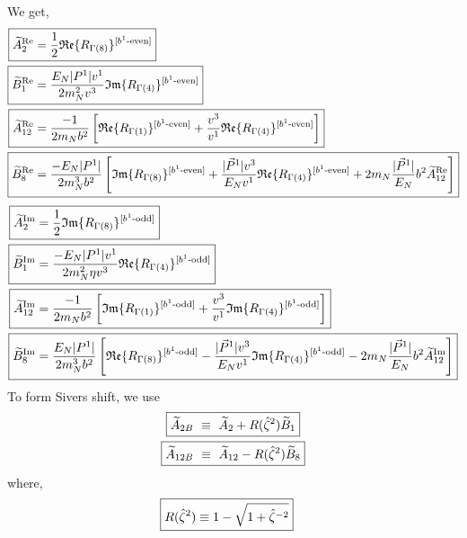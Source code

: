\documentclass[]{article}
\numberwithin{equation}{section}
\newcommand{\tAmp}{\widetilde{A}}
\newcommand{\tBmp}{\widetilde{B}}
\newcommand{\bvec}{b}
\newcommand{\mN}{m_N}
\newcommand{\zetahat}{{\hat \zeta}}
\begin{document}
We get,
\begin{align}
    \Aboxed{\tAmp^{\text{Re}}_2 = & \frac{1}{2}\mathfrak{Re}\{ R_{\Gamma(8)}\}^{[b^{1}\text{-even}]} }\\
    \Aboxed{\tBmp^{\text{Re}}_1 = & \frac{E_{N}|P^1|v^1}{2\mN^2  v^3} \mathfrak{Im}\{ R_{\Gamma(4)}\}^{[b^{1}\text{-even}]}}\\
    \Aboxed{\tAmp^{\text{Re}}_{12}=&\frac{-1}{2\mN  \bvec^2}\left[\mathfrak{Re}\{ R_{\Gamma(1)}\}^{[b^{1}\text{-even}]}+\frac{v^3}{v^1}\mathfrak{Re}\{ R_{\Gamma(4)}\}^{[b^{1}\text{-even}]}\right]}\\
    \Aboxed{\tBmp^{\text{Re}}_8=&\frac{-E_N |P^1|}{ 2\mN^3 \bvec^2 }\left[\mathfrak{Im}\{ R_{\Gamma(8)}\}^{[b^{1}\text{-even}]}+\frac{|\vec{P}^1|v^3}{E_N v^1}\mathfrak{Re}\{ R_{\Gamma(4)}\}^{[b^{1}\text{-even}]}+ 2\mN  \frac{|\vec{P}^1|}{E_N} \bvec^2  \tAmp^{\text{Re}}_{12}\right]}
\end{align}
\begin{align}
    \Aboxed{\tAmp^{\text{Im}}_2 = & \frac{1}{2}\mathfrak{Im}\{ R_{\Gamma(8)}\}^{[b^{1}\text{-odd}]} }\\
    \Aboxed{\tBmp^{\text{Im}}_1 = & \frac{-E_{N}|P^1|v^1}{2\mN^2 \eta v^3} \mathfrak{Re}\{ R_{\Gamma(4)}\}^{[b^{1}\text{-odd}]}}\\
    \Aboxed{\tAmp^{\text{Im}}_{12}=&\frac{-1}{2\mN  \bvec^2}\left[\mathfrak{Im}\{ R_{\Gamma(1)}\}^{[b^{1}\text{-odd}]}+\frac{v^3}{v^1}\mathfrak{Im}\{ R_{\Gamma(4)}\}^{[b^{1}\text{-odd}]}\right]}\\
     \Aboxed{\tBmp^{\text{Im}}_8=&\frac{E_N|P^1|}{ 2\mN^3 \bvec^2  }\left[\mathfrak{Re}\{ R_{\Gamma(8)}\}^{[b^{1}\text{-odd}]}-\frac{|\vec{P}^1|v^3}{E_N v^1}\mathfrak{Im}\{ R_{\Gamma(4)}\}^{[b^{1}\text{-odd}]}- 2\mN  \frac{|\vec{P}^1|}{E_N} \bvec^2  \tAmp^{\text{Im}}_{12}\right]}
\end{align}
To form Sivers shift, we use
\begin{align}
    \Aboxed{\tAmp_{2B}  & \ \equiv\  \tAmp_2 + R(\zetahat^2) \tBmp_1}\\
    \Aboxed{\tAmp_{12B}  & \ \equiv\  \tAmp_{12} - R(\zetahat^2) \tBmp_8}
\end{align}
where,
\begin{align}
    \Aboxed{R(\zetahat^2) \equiv 1- \sqrt{1 + \hat \zeta^{-2}}}
\end{align}
\end{document}
